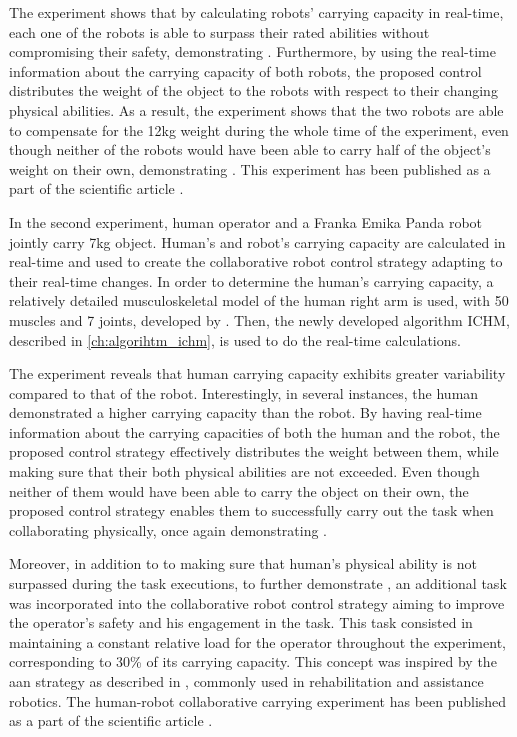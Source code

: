 The experiment shows that by calculating robots' carrying capacity in real-time, each one of the robots is able to surpass their rated abilities without compromising their safety, demonstrating .
Furthermore, by using the real-time information about the carrying capacity of both robots, the proposed control distributes the weight of the object to the robots with respect to their changing physical abilities. As a result, the experiment shows that the two robots are able to compensate for the 12kg weight during the whole time of the experiment, even though neither of the robots would have been able to carry half of the object's weight on their own, demonstrating . This experiment has been published as a part of the scientific article \citet{skuric2021robot}.

In the second experiment, human operator and a Franka Emika Panda robot jointly carry 7kg object. Human's and robot's carrying capacity are calculated in real-time and used to create the collaborative robot control strategy adapting to their real-time changes.
In order to determine the human's carrying capacity, a relatively detailed musculoskeletal model of the human right arm is used, with 50 muscles and 7 joints, developed by \citet{holzbaur2005model}. Then, the newly developed algorithm ICHM, described in \ref{ch:algorihtm_ichm}, is used to do the real-time calculations.

The experiment reveals that human carrying capacity exhibits greater variability compared to that of the robot. Interestingly, in several instances, the human demonstrated a higher carrying capacity than the robot. 
By having real-time information about the carrying capacities of both the human and the robot, the proposed control strategy effectively distributes the weight between them, while making sure that their both physical abilities are not exceeded. Even though neither of them would have been able to carry the object on their own, the proposed control strategy enables them to successfully carry out the task when collaborating physically, once again demonstrating . 

Moreover, in addition to to making sure that human's physical ability is not surpassed during the task executions, to further demonstrate , an additional task was incorporated into the collaborative robot control strategy aiming to improve the operator's safety and his engagement in the task. This task consisted in maintaining a constant relative load for the operator throughout the experiment, corresponding to 30\% of its carrying capacity. This concept was inspired by the \gls{aan} strategy as described in \citet{carmichael2013admittance}, commonly used in rehabilitation and assistance robotics. The human-robot collaborative carrying experiment has been published as a part of the scientific article \citet{Skuric2022human}.

